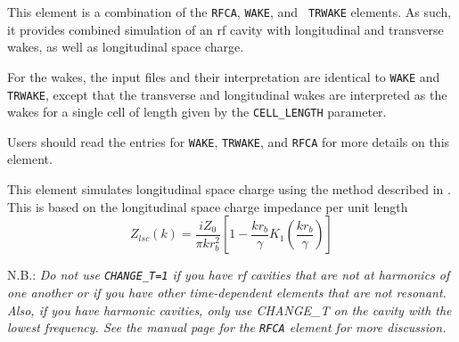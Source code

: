 This element is a combination of the {\tt RFCA}, {\tt WAKE}, and {\tt
TRWAKE} elements.  As such, it provides combined simulation of an rf
cavity with longitudinal and transverse wakes, as well as longitudinal
space charge.

For the wakes, the input files and their interpretation are identical
to {\tt WAKE} and {\tt TRWAKE}, except that the transverse and
longitudinal wakes are interpreted as the wakes for a single cell of
length given by the {\tt CELL\_LENGTH} parameter.

Users should read the entries for {\tt WAKE}, {\tt TRWAKE}, and {\tt RFCA}
for more details on this element.

This element simulates longitudinal space charge using the
method described in \cite{Huang2004}.  This is based on the 
longitudinal space charge impedance per unit length
\begin{equation}
  Z_{lsc}(k) = \frac{i Z_0}{\pi k r_b^2} \left[ 1 - \frac{kr_b}{\gamma}K_1 \left(\frac{kr_b}{\gamma}\right)\right]
\end{equation}

N.B.: {\em Do not use \verb|CHANGE_T=1| if you have rf cavities that
are not at harmonics of one another or if you have other
time-dependent elements that are not resonant. Also, if you have harmonic
cavities, only use CHANGE_T on the cavity with the lowest frequency.
See the manual page for the \verb|RFCA| element for more discussion.}

